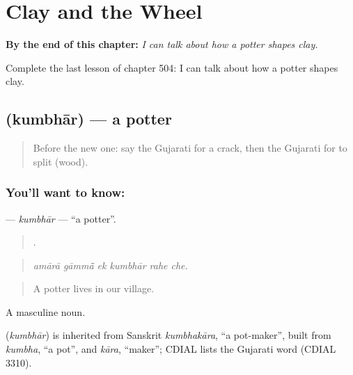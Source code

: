
\chapter{Clay and the Wheel}
\label{ch:gu-clay-and-the-wheel}

\begin{chapteropening}
\textbf{By the end of this chapter:} \emph{I can talk about how a potter shapes clay.}

Complete the last lesson of chapter 504: I can talk about how a potter shapes clay.
\end{chapteropening}

\section[\texorpdfstring{\gu{કુંભાર} (kumbhār)}{કુંભાર (kumbhār)}]{ (kumbhār) — a potter}

\label{lesson:GU-C504-kumbhar}



\begin{quote}
Before the new one: say the Gujarati for a crack, then the Gujarati for to split (wood).
\end{quote}

\subsection*{You'll want to know: }
\textbf{} — \emph{kumbhār} — \textquotedblleft{}a potter\textquotedblright{}.

\begin{quote}
     .
\end{quote}

\begin{quote}
\emph{amārā gāmmā̃ ek kumbhār rahe che.}
\end{quote}

\begin{quote}
A potter lives in our village.
\end{quote}

A masculine noun.

\begin{cousinweb}
\textbf{} (\emph{kumbhār}) is inherited from Sanskrit \emph{kumbhakāra}, \textquotedblleft{}a pot-maker\textquotedblright{}, built from \emph{kumbha}, \textquotedblleft{}a pot\textquotedblright{}, and \emph{kāra}, \textquotedblleft{}maker\textquotedblright{}; CDIAL lists the Gujarati word (CDIAL 3310).
\end{cousinweb}

